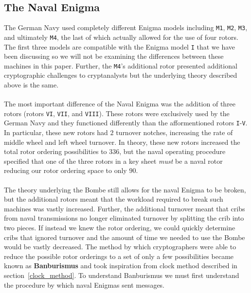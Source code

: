 \subsection{The Naval Enigma}
The German Navy used completely different Enigma models including
\texttt{M1}, \texttt{M2}, \texttt{M3}, and ultimately \texttt{M4},
the last of which actually allowed for the use of four rotors. The
first three models are compatible with the Enigma model \texttt{I}
that we have been discussing so we will not be examining the
differences between these machines in this paper. Further, the
\texttt{M4}'s additional rotor presented additional cryptographic
challenges to cryptanalysts but the underlying theory described above
is the same.
\\\\The most important difference of the Naval Enigma was the
addition of three rotors (rotors \texttt{VI}, \texttt{VII}, and
\texttt{VIII}). These rotors were exclusively used by the German Navy
and they functioned differently than the afformentioned rotors
\texttt{I}-\texttt{V}. In particular, these new rotors had $2$
turnover notches, increasing the rate of middle wheel and left wheel
turnover. In theory, these new rotors increased the total rotor
ordering possibilities to $336$, but the naval operating procedure
specified that one of the three rotors in a key sheet \emph{must} be
a naval rotor reducing our rotor ordering space to only $90$.
\\\\The theory underlying the Bombe still allows for the naval Enigma
to be broken, but the additional rotors meant that the workload
required to break such machines was vastly increased. Further, the
additional turnover meant that cribs from naval transmissions no
longer eliminated turnover by splitting the crib into two pieces. If
instead we knew the rotor ordering, we could quickly determine cribs
that ignored turnover and the amount of time we needed to use the
Bombe would be vastly decreased. The method by which cryptographers
were able to reduce the possible rotor orderings to a set of only a
few possibilities became known as {\bf{Banburismus}} and took
inspiration from clock method described in
section~\ref{clock_method}. To understand Banburismus we must first
understand the procedure by which naval Enigmas sent messages.
